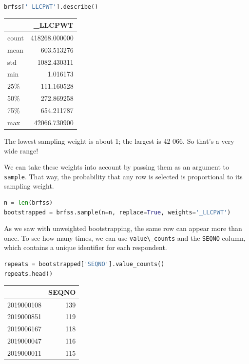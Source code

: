 \begin{lstlisting}[language=Python]
brfss['_LLCPWT'].describe()
\end{lstlisting}

\begin{tabular}{lr}
\toprule
{} &        \_LLCPWT \\
\midrule
count &  418268.000000 \\
mean  &     603.513276 \\
std   &    1082.430311 \\
min   &       1.016173 \\
25\%   &     111.160528 \\
50\%   &     272.869258 \\
75\%   &     654.211787 \\
max   &   42066.730900 \\
\bottomrule
\end{tabular}

The lowest sampling weight is about 1; the largest is 42 066. So that's
a very wide range!

We can take these weights into account by passing them as an argument to
\passthrough{\lstinline!sample!}. That way, the probability that any row
is selected is proportional to its sampling weight.

\begin{lstlisting}[language=Python]
n = len(brfss)
bootstrapped = brfss.sample(n=n, replace=True, weights='_LLCPWT')
\end{lstlisting}

As we saw with unweighted bootstrapping, the same row can appear more
than once. To see how many times, we can use
\passthrough{\lstinline!value\_counts!} and the
\passthrough{\lstinline!SEQNO!} column, which contains a unique
identifier for each respondent.

\begin{lstlisting}[language=Python]
repeats = bootstrapped['SEQNO'].value_counts()
repeats.head()
\end{lstlisting}

\begin{tabular}{lr}
\toprule
{} &  SEQNO \\
\midrule
2019000108 &    139 \\
2019000851 &    119 \\
2019006167 &    118 \\
2019000047 &    116 \\
2019000011 &    115 \\
\bottomrule
\end{tabular}

